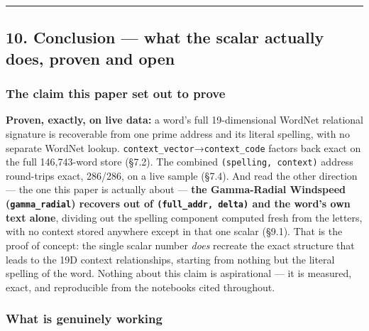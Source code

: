 \documentclass[
  10pt,
]{article}
\begin{document}
\begin{center}\rule{0.5\linewidth}{0.5pt}\end{center}

\hypertarget{conclusion-what-the-scalar-actually-does-proven-and-open}{%
\subsection{10. Conclusion --- what the scalar actually does, proven and
open}\label{conclusion-what-the-scalar-actually-does-proven-and-open}}

\hypertarget{the-claim-this-paper-set-out-to-prove}{%
\subsubsection{The claim this paper set out to
prove}\label{the-claim-this-paper-set-out-to-prove}}

\textbf{Proven, exactly, on live data:} a word's full 19-dimensional
WordNet relational signature is recoverable from one prime address and
its literal spelling, with no separate WordNet lookup.
\texttt{context\_vector}→\texttt{context\_code} factors back exact on
the full 146,743-word store (§7.2). The combined
\texttt{(spelling,\ context)} address round-trips exact, 286/286, on a
live sample (§7.4). And read the other direction --- the one this paper
is actually about --- \textbf{the Gamma-Radial Windspeed
(\texttt{gamma\_radial}) recovers out of \texttt{(full\_addr,\ delta)}
and the word's own text alone}, dividing out the spelling component
computed fresh from the letters, with no context stored anywhere except
in that one scalar (§9.1). That is the proof of concept: the single
scalar number \emph{does} recreate the exact structure that leads to the
19D context relationships, starting from nothing but the literal
spelling of the word. Nothing about this claim is aspirational --- it is
measured, exact, and reproducible from the notebooks cited throughout.

\hypertarget{what-is-genuinely-working}{%
\subsubsection{What is genuinely
working}\label{what-is-genuinely-working}}
\end{document}
